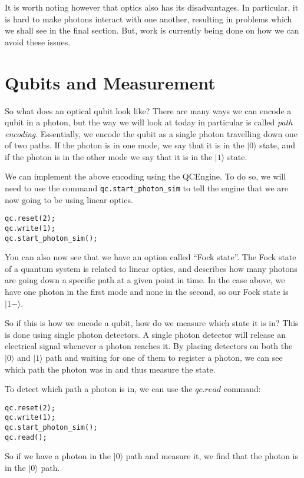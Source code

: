 \documentclass[twocolumn]{article}
\begin{document}
It is worth noting however that optics also has its disadvantages. In particular, it is hard to make photons interact with one another, resulting in problems which we shall see in the final section. But, work is currently being done on how we can avoid these issues.

\section{Qubits and Measurement}

So what does an optical qubit look like? There are many ways we can encode a qubit in a photon, but the way we will look at today in particular is called {\em path encoding}. Essentially, we encode the qubit as a single photon travelling down one of two paths. If the photon is in one mode, we say that it is in the $|0\rangle$ state, and if the photon is in the other mode we say that it is in the $|1\rangle$ state.

We can implement the above encoding using the QCEngine. To do so, we will need to use the command \texttt{qc.start\_photon\_sim} to tell the engine that we are now going to be using linear optics.

\begin{lstlisting}
qc.reset(2);
qc.write(1);
qc.start_photon_sim();
\end{lstlisting}

You can also now see that we have an option called ``Fock state''. The Fock state of a quantum system is related to linear optics, and describes how many photons are going down a specific path at a given point in time. In the case above, we have one photon in the first mode and none in the second, so our Fock state is $|1-\rangle$.

So if this is how we encode a qubit, how do we measure which state it is in? This is done using single photon detectors. A single photon detector will release an electrical signal whenever a photon reaches it. By placing detectors on both the $|0\rangle$ and $|1\rangle$ path and waiting for one of them to register a photon, we can see which path the photon was in and thus measure the state.

To detect which path a photon is in, we can use the $qc.read$ command:

\begin{lstlisting}
qc.reset(2);
qc.write(1);
qc.start_photon_sim();
qc.read();
\end{lstlisting}

So if we have a photon in the $|0\rangle$ path and measure it, we find that the photon is in the $|0\rangle$ path.
\end{document}
